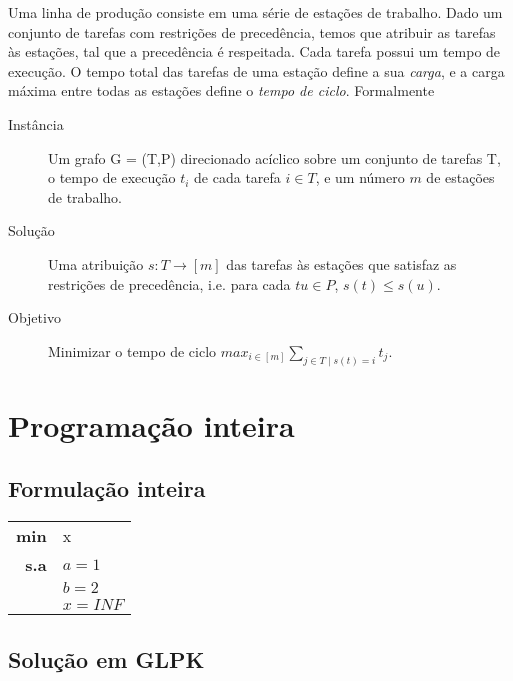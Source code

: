 \documentclass{report}
\begin{document}
Uma linha de produção consiste em uma série de estações de trabalho.
Dado um conjunto de tarefas com restrições de
precedência, temos que atribuir as tarefas às estações, tal que a precedência
é respeitada. Cada tarefa possui um tempo
de execução. O tempo total das tarefas de uma estação define a sua
\emph{carga}, e a carga máxima entre todas as
estações define o \emph{tempo de ciclo}. Formalmente

\begin{description}
 \item [Instância] Um grafo G = (T,P) direcionado acíclico sobre um conjunto de
 tarefas T, o tempo de execução $t_i$ de
cada tarefa $i \in T$, e um número $m$ de estações de trabalho.

 \item [Solução] Uma atribuição $s : T \rightarrow [m]$ das tarefas às
 estações que satisfaz as restrições de
precedência, i.e. para cada $tu \in P$, $s(t) \leq s(u)$.

 \item [Objetivo] Minimizar o tempo de ciclo  $max_{i\in[m]}\sum_{j\in T\mid s(t)=i}t_j$.
\end{description}

\chapter{Programação inteira}

\section{Formulação inteira}

\begin{center}
\begin{tabular}{ r l }
  \textbf{min} & x \\
  \textbf{s.a} & $a = 1$ \\
  & $b = 2$ \\
  & $x = INF$ \\
\end{tabular}
\end{center}

\section{Solução em GLPK}
\end{document}
